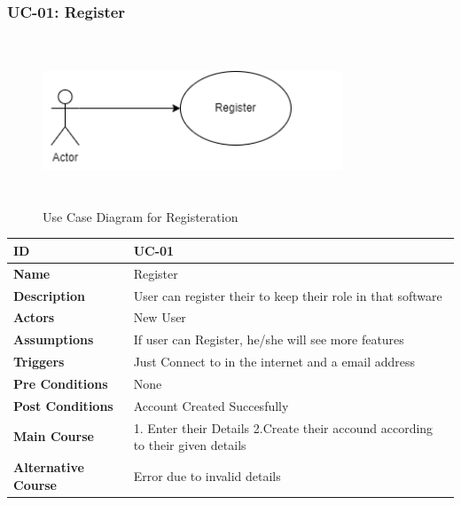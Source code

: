 \setcounter{figure}{0}
\subsubsection{UC-01: Register}
    \begin{figure}[H]
    \includegraphics[height=5cm, width=0.8\textwidth]{./diagrams/Use Case/u1.png}
    \centering 
    \caption{Use Case Diagram for Registeration}
    \label{figure1}
    \end{figure}
    
    \begin{center}
        \begin{tabularx}{\textwidth}{|l|X|}
            \hline
            \textbf{ID} & UC-01 \\
            \hline
            \textbf{Name} & Register \\
            \hline
            \textbf{Description} & User can register their to keep their role in that software \\
            \hline
            \textbf{Actors} & New User \\
            \hline
            \textbf{Assumptions} & If user can Register, he/she will see more features \\
            \hline
            \textbf{Triggers} & Just Connect to in the internet and a email address \\
            \hline
            \textbf{Pre Conditions} & None \\
            \hline
            \textbf{Post Conditions} & Account Created Succesfully \\
            \hline
            \textbf{Main Course} & 1. Enter their Details 2.Create their accound according to their given details \\
            \hline
            \textbf{Alternative Course} & Error due to invalid details \\
            \hline
            
        \end{tabularx}
    \end{center}
    \newpage
    

